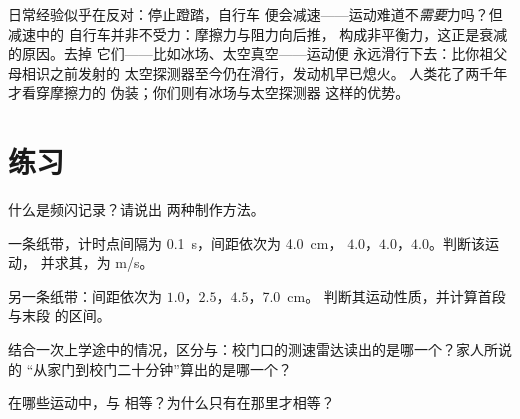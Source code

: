 \begin{remark}[这句话为何令人惊讶]\label{rem:g9:uniform-varied-motion:surprise}
日常经验似乎在反对：停止蹬踏，自行车
便会减速——运动难道不\emph{需要}力吗？但减速中的
自行车并非不受力：摩擦力与阻力向后推，
构成非平衡力，这正是衰减的原因。去掉
它们——比如冰场、太空真空——运动便
永远滑行下去：比你祖父母相识之前发射的
太空探测器至今仍在滑行，发动机早已熄火。
人类花了两千年才看穿摩擦力的
伪装；你们则有冰场与太空探测器
这样的优势。
\end{remark}

\section{练习}

\begin{exercise}[$\star$]\label{exo:g9:uniform-varied-motion:1}
什么是频闪记录？请说出
两种制作方法。
\end{exercise}

\begin{exercise}[$\star$]\label{exo:g9:uniform-varied-motion:2}
一条纸带，计时点间隔为 \qty{0.1}{s}，间距依次为 \qty{4.0}{cm}，
$4.0$，$4.0$，$4.0$。判断该运动，
并求其，为 \unit{m/s}。
\end{exercise}

\begin{exercise}[$\star$]\label{exo:g9:uniform-varied-motion:3}
另一条纸带：间距依次为 $1.0$，$2.5$，$4.5$，\qty{7.0}{cm}。
判断其运动性质，并计算首段与末段
的区间。
\end{exercise}

\begin{exercise}[$\star$]\label{exo:g9:uniform-varied-motion:4}
结合一次上学途中的情况，区分与：校门口的测速雷达读出的是哪一个？家人所说的
“从家门到校门二十分钟”算出的是哪一个？
\end{exercise}

\begin{exercise}[$\star$]\label{exo:g9:uniform-varied-motion:5}
在哪些运动中，与
相等？为什么只有在那里才相等？
\end{exercise}


